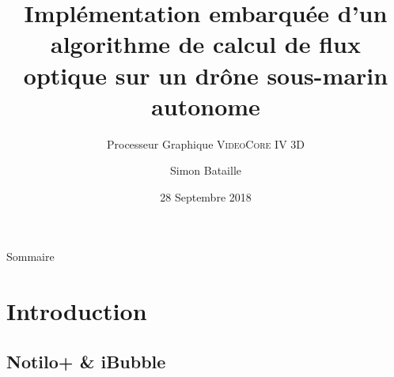 \documentclass{bredelebeamer}
\title[Calcul du flux optique sur Raspbery Pi]{Implémentation embarquée d'un algorithme de calcul de flux optique sur un dr\^one sous-marin autonome}
\subtitle{Processeur Graphique \textsc{VideoCore IV 3D}}
\author{Simon Bataille\inst{1}}
\institute[Université de Caen Normandie]
{
  \inst{1}%
  ESIX NORMANDIE\\
  Département Mécatronique \& Systèmes Nomades
  }
\date{28 Septembre 2018}
\begin{document}
\begin{frame}
  \titlepage
\end{frame}





\begin{frame}{Sommaire}
  \tableofcontents
\end{frame}





\section{Introduction}


\subsection{Notilo+ \& iBubble}

\end{document}
